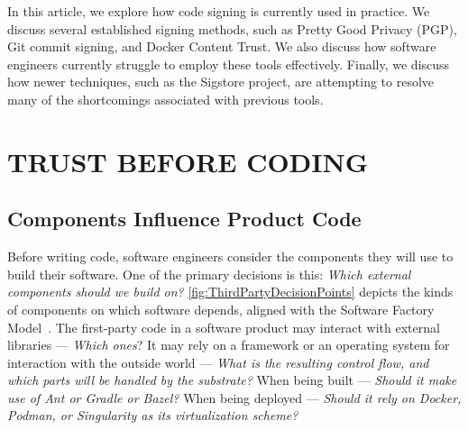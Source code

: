 \documentclass{IEEEcsmagTechrxiv}
\begin{document}
	In this article, we explore how code signing is currently used in practice.
	We discuss several established signing methods, such as Pretty Good Privacy (PGP), Git commit signing, and Docker Content Trust.
	We also discuss how software engineers currently struggle to employ these tools effectively.
	Finally, we discuss how newer techniques, such as the Sigstore project, are attempting to resolve many of the shortcomings associated with previous tools.
\fi



\section{TRUST BEFORE CODING}


\subsection{Components Influence Product Code}

Before writing code, software engineers consider the components they will use to build their software.
%
%
One of the primary decisions is this:
\textit{Which external components should we build on?}
\cref{fig:ThirdPartyDecisionPoints} depicts the kinds of components on which software depends, aligned with the Software Factory Model~\cite{SLSA_SFM}.
The first-party code in a software product may interact with external libraries --- \textit{Which ones}?
It may rely on a framework or an operating system for interaction with the outside world --- \textit{What is the resulting control flow, and which parts will be handled by the substrate?}
When being built --- \textit{Should it make use of Ant or Gradle or Bazel?}
When being deployed --- \textit{Should it rely on Docker, Podman, or Singularity as its virtualization scheme?}
\end{document}
